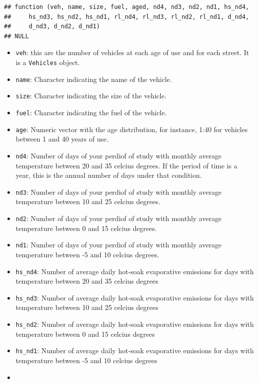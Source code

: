 \documentclass[12pt,graybox,envcountchap,sectrefs]{krantz}
\providecommand{\tightlist}{%
  \setlength{\itemsep}{0pt}\setlength{\parskip}{0pt}}
\theoremstyle{definition}
\theoremstyle{definition}
\theoremstyle{definition}
\theoremstyle{remark}
\begin{document}
\begin{verbatim}
## function (veh, name, size, fuel, aged, nd4, nd3, nd2, nd1, hs_nd4, 
##     hs_nd3, hs_nd2, hs_nd1, rl_nd4, rl_nd3, rl_nd2, rl_nd1, d_nd4, 
##     d_nd3, d_nd2, d_nd1) 
## NULL
\end{verbatim}

\begin{itemize}
\tightlist
\item
  \texttt{veh}: this are the number of vehicles at each age of use and
  for each street. It is a \texttt{Vehicles} object.
\item
  \texttt{name}: Character indicating the name of the vehicle.
\item
  \texttt{size}: Character indicating the size of the vehicle.
\item
  \texttt{fuel}: Character indicating the fuel of the vehicle.
\item
  \texttt{age}: Numeric vector with the age distribution, for instance,
  1:40 for vehicles between 1 and 40 years of use.
\item
  \texttt{nd4}: Number of days of your perdiof of study with monthly
  average temperature between 20 and 35 celcius degrees. If the period
  of time is a year, this is the annual number of days under that
  condition.
\item
  \texttt{nd3}: Number of days of your perdiof of study with monthly
  average temperature between 10 and 25 celcius degrees.
\item
  \texttt{nd2}: Number of days of your perdiof of study with monthly
  average temperature between 0 and 15 celcius degrees.
\item
  \texttt{nd1}: Number of days of your perdiof of study with monthly
  average temperature between -5 and 10 celcius degrees.
\item
  \texttt{hs\_nd4}: Number of average daily hot-soak evaporative
  emissions for days with temperature between 20 and 35 celcius degrees
\item
  \texttt{hs\_nd3}: Number of average daily hot-soak evaporative
  emissions for days with temperature between 10 and 25 celcius degrees
\item
  \texttt{hs\_nd2}: Number of average daily hot-soak evaporative
  emissions for days with temperature between 0 and 15 celcius degrees
\item
  \texttt{hs\_nd1}: Number of average daily hot-soak evaporative
  emissions for days with temperature between -5 and 10 celcius degrees
\item

\end{itemize}
\end{document}
